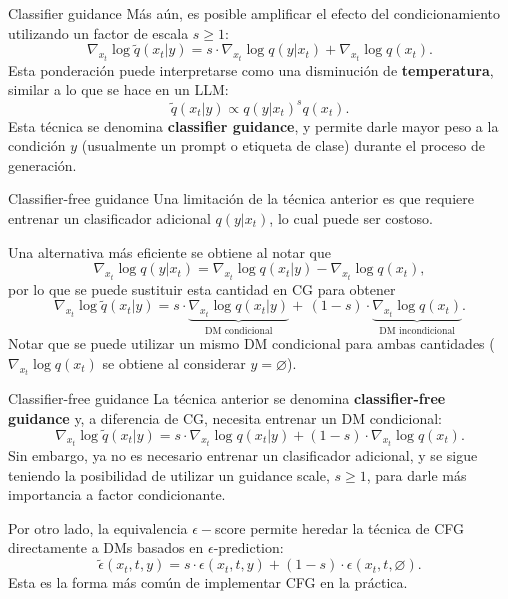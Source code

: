 \documentclass{beamer}
\begin{document}
\begin{frame}{Classifier guidance}
    Más aún, es posible amplificar el efecto del condicionamiento utilizando un factor de escala $s\geq1$:
    \begin{equation*}
        \nabla_{x_t}\log \tilde q(x_t|y) = s\cdot\nabla_{x_t}\log q(y|x_t) + \nabla_{x_t}\log q(x_t).
    \end{equation*}
    Esta ponderación puede interpretarse como una disminución de \textbf{temperatura}, similar a lo que se hace en un LLM:
    \begin{equation*}
        \tilde q(x_t|y) \propto q(y|x_t)^s q(x_t).
    \end{equation*}
    Esta técnica se denomina \textbf{classifier guidance}, y permite darle mayor peso a la condición $y$ (usualmente un prompt o etiqueta de clase) durante el proceso de generación.
\end{frame}

\begin{frame}{Classifier-free guidance}
    Una limitación de la técnica anterior es que requiere entrenar un clasificador adicional $q(y|x_t)$, lo cual puede ser costoso.

    Una alternativa más eficiente se obtiene al notar que
    \begin{equation*}
        \nabla_{x_t}\log q(y|x_t) = \nabla_{x_t}\log q(x_t|y) - \nabla_{x_t}\log q(x_t),
    \end{equation*}
    por lo que se puede sustituir esta cantidad en CG para obtener
    \begin{equation*}
        \nabla_{x_t}\log \tilde q(x_t|y) = s\cdot\underbrace{\nabla_{x_t}\log q(x_t|y)}_{ \text{DM condicional}} +\, (1-s)\cdot\underbrace{\nabla_{x_t}\log q(x_t)}_{\text{DM incondicional}}.
    \end{equation*}
    Notar que se puede utilizar un mismo DM condicional para ambas cantidades ($\nabla_{x_t}\log q(x_t)$ se obtiene al considerar $y=\varnothing$).
\end{frame}

\begin{frame}{Classifier-free guidance}
    La técnica anterior se denomina \textbf{classifier-free guidance} y, a diferencia de CG, necesita entrenar un DM condicional:
    \begin{equation*}
        \nabla_{x_t}\log \tilde q(x_t|y) = s\cdot\nabla_{x_t}\log q(x_t|y) + (1-s)\cdot\nabla_{x_t}\log q(x_t).
    \end{equation*}
    Sin embargo, ya no es necesario entrenar un clasificador adicional, y se sigue teniendo la posibilidad de utilizar un guidance scale, $s\geq1$, para darle más importancia a factor condicionante.

    Por otro lado, la equivalencia $\epsilon-$score permite heredar la técnica de CFG directamente a DMs basados en $\epsilon$-prediction:
    \begin{equation*}
        \tilde\epsilon(x_t,t,y) = s\cdot\epsilon(x_t,t,y) + (1-s)\cdot\epsilon(x_t,t,\varnothing).
    \end{equation*}
    Esta es la forma más común de implementar CFG en la práctica.
\end{frame}
\end{document}
